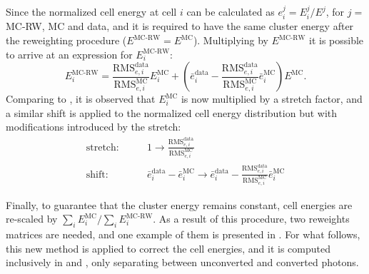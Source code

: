 Since the normalized cell energy at cell \(i\) can be calculated as \(e_i^{j} = E_i^{j} / E^{j}\), for \(j=\)MC-RW, MC and data, and it is required to have the same cluster energy after the reweighting procedure (\(E^{\text{MC-RW}} = E^{\text{MC}}\)). Multiplying \Eqn{\ref{eq:ss_corrections:cell_rw:calculation:new:normalized_e}} by \(E^{\text{MC-RW}}\) it is possible to arrive at an expression for \(E_i^{\text{MC-RW}}\):
\begin{equation}
    \label{eq:ss_corrections:cell_rw:calculation:new:correction_method}
    E_i^{\text{MC-RW}} = \frac{\text{RMS}_{e,i}^{\text{data}}}{\text{RMS}_{e,i}^{\text{MC}}} E_i^{\text{MC}} + \left( \bar e_i^{\text{data}} - \frac{\text{RMS}_{e,i}^{\text{data}}}{\text{RMS}_{e,i}^{\text{MC}}} \bar e_i^{\text{MC}} \right) E^{\text{MC}}.
\end{equation}
Comparing \Eqn{\ref{eq:ss_corrections:cell_rw:calculation:new:correction_method}} to \Eqn{\ref{eq:ss_corrections:cell_rw:calculation:previous:correction_method}}, it is observed that \(E_i^{\text{MC}}\) is now multiplied by a stretch factor, and a similar shift is applied to the normalized cell energy distribution but with modifications introduced by the stretch:
\begin{equation*}
    \begin{split}
        \text{stretch:}& \qquad 1 \to \frac{\text{RMS}_{e,i}^{\text{data}}}{\text{RMS}_{e,i}^{\text{MC}}}\\
        \text{shift:}& \qquad \bar e_i^{\text{data}} - \bar e_i^{\text{MC}} \to \bar e_i^{\text{data}} - \frac{\text{RMS}_{e,i}^{\text{data}}}{\text{RMS}_{e,i}^{\text{MC}}} \bar e_i^{\text{MC}}
    \end{split}
\end{equation*}

Finally, to guarantee that the cluster energy remains constant, cell energies are re-scaled by \(\sum_i E_i^{\text{MC}} / \sum_i E_i^{\text{MC-RW}}\). As a result of this procedure, two reweights matrices are needed, and one example of them is presented in \Fig{\ref{fig:ss_corrections:cell_rw:calculation:new:reweights}}.
For what follows, this new method is applied to correct the cell energies, and it is computed inclusively in \pt and \abseta, only separating between unconverted and converted photons.

